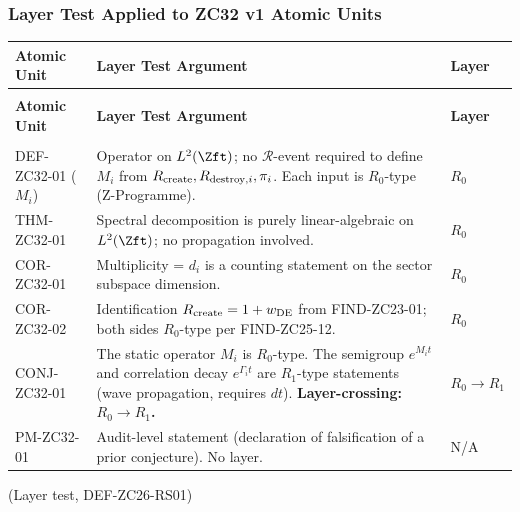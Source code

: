 \documentclass[12pt, a4paper]{article}
\begin{document}
\subsubsection{Layer Test Applied to ZC32 v1 Atomic Units}

\begin{derivedbox}[title={Layer test of ZC32 v1 atomic units
  (DEF-ZC26-RS01)}]
{\small
\setlength{\LTpre}{4pt}
\setlength{\LTpost}{4pt}
\renewcommand{\arraystretch}{1.30}
\begin{longtable}{>{\raggedright\arraybackslash}p{2.6cm}
                  >{\raggedright\arraybackslash}p{7.4cm}
                  >{\centering\arraybackslash}p{2.2cm}}
\toprule
\textbf{Atomic Unit} & \textbf{Layer Test Argument}
  & \textbf{Layer}\\
\midrule
\endfirsthead
\multicolumn{3}{l}{\small\textit{(continued)}}\\[4pt]
\toprule
\textbf{Atomic Unit} & \textbf{Layer Test Argument}
  & \textbf{Layer}\\
\midrule
\endhead
\midrule
\multicolumn{3}{r}{\small\textit{(continues)}}\\
\endfoot
\bottomrule
\endlastfoot
DEF-ZC32-01 ($M_i$)
  & Operator on $L^2(\Zft)$; no $\mathcal{R}$-event required
    to define $M_i$ from $R_{\rm create}, R_{{\rm destroy},i},
    \pi_i$. Each input is $R_0$-type (Z-Programme).
  & $R_0$\\
THM-ZC32-01
  & Spectral decomposition is purely linear-algebraic on
    $L^2(\Zft)$; no propagation involved.
  & $R_0$\\
COR-ZC32-01
  & Multiplicity = $d_i$ is a counting statement on the
    sector subspace dimension.
  & $R_0$\\
COR-ZC32-02
  & Identification $R_{\rm create} = 1 + w_{\rm DE}$ from
    FIND-ZC23-01; both sides $R_0$-type per FIND-ZC25-12.
  & $R_0$\\
CONJ-ZC32-01
  & The static operator $M_i$ is $R_0$-type. The semigroup
    $e^{M_i t}$ and correlation decay $e^{\Gamma_i t}$ are
    $R_1$-type statements (wave propagation, requires $dt$).
    \textbf{Layer-crossing: $R_0 \to R_1$.}
  & $R_0 \to R_1$\\
PM-ZC32-01
  & Audit-level statement (declaration of falsification of
    a prior conjecture). No layer.
  & N/A\\
\end{longtable}
}
\vspace{-6pt}
\hfill\textup{(Layer test, DEF-ZC26-RS01)}
\end{derivedbox}
\end{document}
